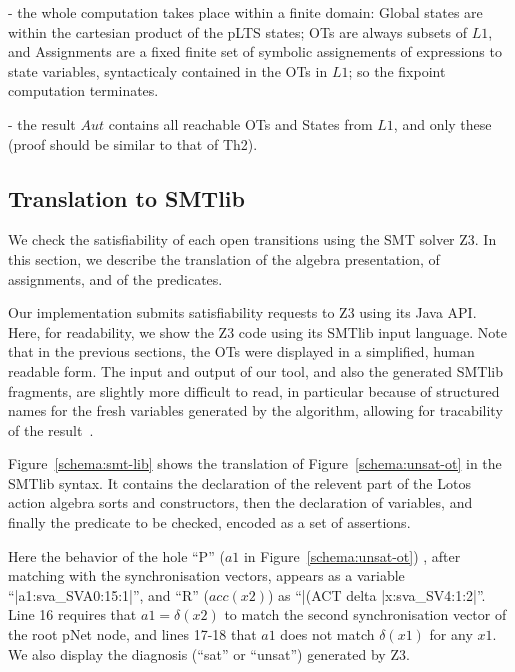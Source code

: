 \documentclass[smallcondensed]{svjour3}
\newcommand{\noteInEM}[2][inline,color=green!40]{\todo[#1]{{\bf Eric: } {#2}}}
\begin{document}
  - the whole computation takes place within a finite domain: Global
  states are within the cartesian product of the pLTS states; OTs are
  always subsets of $L1$, and Assignments are a fixed finite set of
  symbolic assignements of expressions to state variables,
  syntacticaly contained in the OTs in $L1$; so the fixpoint
  computation terminates.

  - the result $Aut$ contains all reachable OTs and States from $L1$,
  and only these (proof should be similar to that of Th2).


\subsection{Translation to SMTlib}
\label{section:TranslationToSMTlib}

We check the satisfiability of each open transitions
using the SMT solver Z3.
In this
section, we describe the translation of the algebra presentation, of
assignments, and of the predicates.

Our implementation submits satisfiability requests to
Z3 using its Java API. Here, for readability, we
show the Z3 code using its SMTlib input language.
Note that in the previous sections, the OTs were displayed in a
simplified, human readable form. The input and output of our tool, and
also the generated SMTlib fragments, are
slightly more difficult to read, in 
particular because of structured names for the fresh variables generated
by the algorithm, allowing for tracability of the result~\cite{Avocs-RR}.

Figure~\ref{schema:smt-lib} shows the translation of  Figure~\ref{schema:unsat-ot}
in the SMTlib syntax. It contains the declaration
of the relevent part of the Lotos action algebra sorts 
and constructors, then the declaration of variables, and finally the
predicate to be checked, encoded as a set of assertions.

Here the behavior of the hole ``P'' ($a1$ in Figure~\ref{schema:unsat-ot}) , after matching with the synchronisation vectors, appears as a variable
``|a1:sva\_SVA0:15:1|'', and ``R'' ($acc(x2)$) as ``|(ACT delta
|x:sva\_SV4:1:2|''. Line 16 requires that $a1 = \delta(x2)$ to match
the second synchronisation vector of the root pNet node, and lines
17-18 that $a1$ does not match $\delta(x1)$ for any $x1$. 
We also display  the diagnosis (``sat'' or ``unsat'') generated by Z3.
\end{document}
